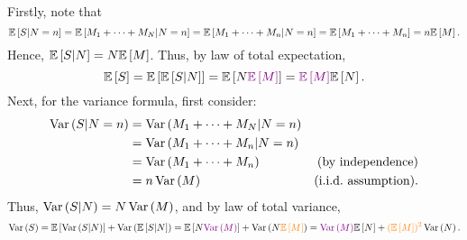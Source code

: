 \begin{enumerate}
\begin{pf}
Firstly, note that
\[
\expv{S|N=n}=\expv{M_1+\dotsb+M_N|N=n}
=\expv{M_1+\dotsb+M_n|N=n}=\expv{M_1+\dotsb+M_n}
=n\expv{M}.
\]
Hence, \(\expv{S|N}=N\expv{M}\). Thus, by law of total expectation,
\[
\expv{S}=\expv{\expv{S|N}}
=\expv{N{\color{violet}\expv{M}}}
={\color{violet}\expv{M}}\expv{N}.
\]
Next, for the variance formula, first consider:
\begin{align*}
\vari{S|N=n}
&=\vari{M_1+\dotsb+M_N|N=n} \\
&=\vari{M_1+\dotsb+M_n|N=n} \\
&=\vari{M_1+\dotsb+M_n} &\text{(by independence)}\\
&=n\vari{M}&\text{(i.i.d.\ assumption)}.
\end{align*}
Thus, \(\vari{S|N}=N\vari{M}\), and by law of total variance,
\[
\vari{S}=\expv{\vari{S|N}}+\vari{\expv{S|N}}
=\expv{N{\color{violet}\vari{M}}}+\vari{N{\color{orange}\expv{M}}}
={\color{violet}\vari{M}}\expv{N}+{\color{orange}(\expv{M})^2}\vari{N}.
\]
\end{pf}
\end{enumerate}
